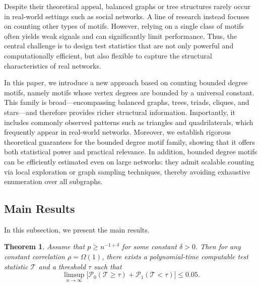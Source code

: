 \documentclass[letterpaper,11pt]{article}
\newtheorem{theorem}{Theorem}
\theoremstyle{definition}
\newcommand{\maP}{\mathcal{P}}
\newcommand{\maT}{\mathcal{T}}
\newcommand{\nbr}[1]{{\sf\color{red}[#1]}}
\begin{document}
Despite their theoretical appeal, balanced graphs or tree structures rarely occur in real-world settings such as social networks.
A line of research instead focuses on counting other types of motifs. %
However, relying on a single class of motifs often yields weak signals and can significantly limit performance.
Thus, the central challenge is to design test statistics that are not only powerful and computationally efficient, but also flexible to capture the structural characteristics of real networks.

In this paper, we introduce a new approach based on counting bounded degree motifs, namely motifs whose vertex degrees are bounded by a universal constant. This family is broad—encompassing balanced graphs, trees, triads, cliques, and stars—and therefore provides richer structural information.
Importantly, it includes commonly observed patterns such as triangles and quadrilaterals, which frequently appear in real-world networks.
Moreover, we establish rigorous theoretical guarantees for the bounded degree motif family, showing that it offers both statistical power and practical relevance.
In addition, bounded degree motifs can be efficiently estimated even on large networks: they admit scalable counting via local exploration or graph sampling techniques, thereby avoiding exhaustive enumeration over all subgraphs.

\subsection{Main Results}

In this subsection, we present the main results. 

\begin{theorem}\label{thm:main}
Assume that $p\ge n^{-1+\delta}$ for some constant $\delta>0$. Then for any constant correlation $\rho=\Omega(1)$, there exists a polynomial-time computable test statistic $\maT$ and a threshold $\tau$ such that
\[
\limsup_{n\to\infty}\big[\maP_0(\maT\ge \tau)+\maP_1(\maT<\tau)\big]\le 0.05.
\]
\end{theorem}
\end{document}
